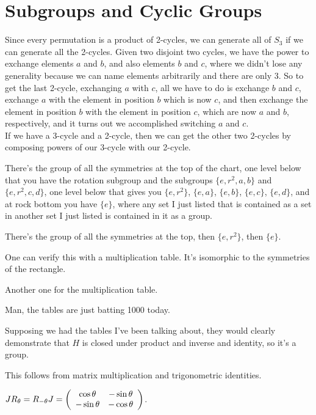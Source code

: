 \documentclass[11pt, oneside]{article}   	%
\begin{document}
\section{Subgroups and Cyclic Groups}
\be
\item Since every permutation is a product of 2-cycles, we can generate all of $S_3$ if we can generate all the 2-cycles. Given two disjoint two cycles, we have the power to exchange elements $a$ and $b$, and also elements $b$ and $c$, where we didn't lose any generality because we can name elements arbitrarily and there are only 3. So to get the last 2-cycle, exchanging $a$ with $c$, all we have to do is exchange $b$ and $c$, exchange $a$ with the element in position $b$ which is now $c$, and then exchange the element in position $b$ with the element in position $c$, which are now $a$ and $b$, respectively, and it turns out we accomplished switching $a$ and $c$. \\
If we have a 3-cycle and a 2-cycle, then we can get the other two 2-cycles by composing powers of our 3-cycle with our 2-cycle. 
\item There's the group of all the symmetries at the top of the chart, one level below that you have the rotation subgroup and the subgroups $\{e, r^2, a, b\}$ and $\{e, r^2, c, d\}$, one level below that gives you $\{e, r^2\}$, $\{e, a\}$, $\{e, b\}$, $\{e, c\}$, $\{e, d\}$, and at rock bottom you have $\{e\}$, where any set I just listed that is contained as a set in another set I just listed is contained in it as a group.
\item There's the group of all the symmetries at the top, then $\{e, r^2\}$, then $\{e\}$.
\item \be
\item One can verify this with a multiplication table. It's isomorphic to the symmetries of the rectangle.
\item Another one for the multiplication table.
\item Man, the tables are just batting 1000 today.
\item Supposing we had the tables I've been talking about, they would clearly demonstrate that $H$ is closed under product and inverse and identity, so it's a group.
\ee
\item \be
\item This follows from matrix multiplication and trigonometric identities.
\item $JR_\theta = R_{-\theta}J = \left( \begin{array}{ccc} \cos\theta & -\sin\theta \\ -\sin\theta & -\cos\theta \end{array} \right)$.
\end{document}
